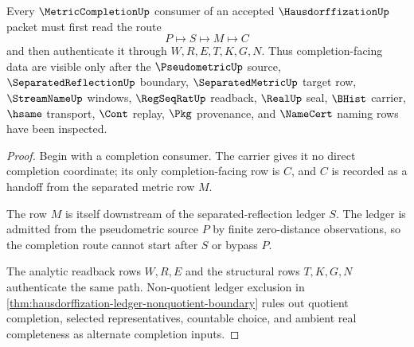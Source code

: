 \begin{theorem}
\label{thm:hausdorffization-completion-consumer-route}
Every $\MetricCompletionUp$ consumer of an accepted $\HausdorffizationUp$ packet must first read the route
$$
P \longmapsto S \longmapsto M \longmapsto C
$$
and then authenticate it through $W,R,E,T,K,G,N$. Thus completion-facing data are visible only after the $\PseudometricUp$ source, $\SeparatedReflectionUp$ boundary, $\SeparatedMetricUp$ target row, $\StreamNameUp$ windows, $\RegSeqRatUp$ readback, $\RealUp$ seal, $\BHist$ carrier, $\hsame$ transport, $\Cont$ replay, $\Pkg$ provenance, and $\NameCert$ naming rows have been inspected.
\end{theorem}
\begin{proof}
Begin with a completion consumer. The carrier gives it no direct completion coordinate; its only completion-facing row is $C$, and $C$ is recorded as a handoff from the separated metric row $M$.

The row $M$ is itself downstream of the separated-reflection ledger $S$. The ledger is admitted from the pseudometric source $P$ by finite zero-distance observations, so the completion route cannot start after $S$ or bypass $P$.

The analytic readback rows $W,R,E$ and the structural rows $T,K,G,N$ authenticate the same path. Non-quotient ledger exclusion in \autoref{thm:hausdorffization-ledger-nonquotient-boundary} rules out quotient completion, selected representatives, countable choice, and ambient real completeness as alternate completion inputs.
\end{proof}

